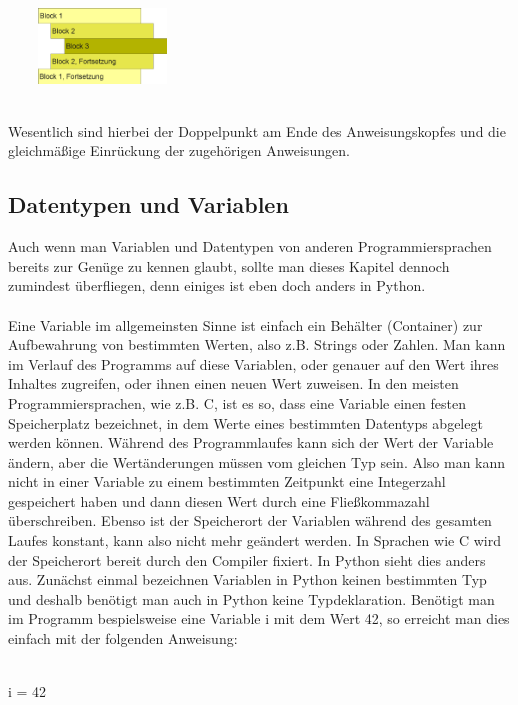 \begin{minipage}{-0.8\textwidth}
\centering
\includegraphics[width=5cm,height=2cm]{pics/bloecke300.png}
\label{fig:bloecke300}
\end{minipage}
\\
Wesentlich sind hierbei der Doppelpunkt am Ende des Anweisungskopfes und die gleichmäßige Einrückung der zugehörigen Anweisungen.

\subsection{Datentypen und Variablen}
Auch wenn man Variablen und Datentypen von anderen Programmiersprachen bereits zur Genüge zu kennen glaubt, sollte man dieses Kapitel dennoch zumindest überfliegen, denn einiges ist eben doch anders in Python. \\
\\
Eine Variable im allgemeinsten Sinne ist einfach ein Behälter (Container) zur Aufbewahrung von bestimmten Werten, also z.B. Strings oder Zahlen. Man kann im Verlauf des Programms auf diese Variablen, oder genauer auf den Wert ihres Inhaltes zugreifen, oder ihnen einen neuen Wert zuweisen.
In den meisten Programmiersprachen, wie z.B. C, ist es so, dass eine Variable einen festen Speicherplatz bezeichnet, in dem Werte eines bestimmten Datentyps abgelegt werden können. Während des Programmlaufes kann sich der Wert der Variable ändern, aber die Wertänderungen müssen vom gleichen Typ sein. Also man kann nicht in einer Variable zu einem bestimmten Zeitpunkt eine Integerzahl gespeichert haben und dann diesen Wert durch eine Fließkommazahl überschreiben. Ebenso ist der Speicherort der Variablen während des gesamten Laufes konstant, kann also nicht mehr geändert werden. In Sprachen wie C wird der Speicherort bereit durch den Compiler fixiert.
In Python sieht dies anders aus. Zunächst einmal bezeichnen Variablen in Python keinen bestimmten Typ und deshalb benötigt man auch in Python keine Typdeklaration. Benötigt man im Programm bespielsweise eine Variable i mit dem Wert 42, so erreicht man dies einfach mit der folgenden Anweisung: \\
\\
\begin{MyConsoleBox}{
i = 42
}\end{MyConsoleBox}
